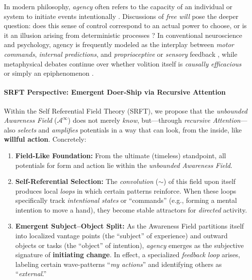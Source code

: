 \documentclass[12pt,a4paper]{article}
\begin{document}
In modern philosophy, \emph{agency} often refers to the capacity of an individual
or system to initiate events intentionally \cite{shoemaker2003agency,metzinger2003subject}. Discussions of \emph{free will} pose the
deeper question: does this sense of control correspond to an actual power to choose,
or is it an illusion arising from deterministic processes \cite{wegner2002}?
In conventional neuroscience and psychology, agency is frequently modeled as the interplay
between \emph{motor commands}, \emph{internal predictions}, and \emph{proprioceptive} or
\emph{sensory} feedback \cite{frith2012action}, while metaphysical debates continue over
whether volition itself is \emph{causally efficacious} or simply an epiphenomenon
\cite{whitehead1929process}.

\paragraph{SRFT Perspective: Emergent Doer-Ship via Recursive Attention}
\label{subsec:SRFT-agency-perspective}

Within the Self Referential Field Theory (SRFT), we propose that the \emph{unbounded
Awareness Field} (\(\mathscr{A}^\infty\)) does not merely \emph{know}, but---through
\emph{recursive Attention}---also \emph{selects} and \emph{amplifies} potentials in a way
that can look, from the inside, like \textbf{willful action}. Concretely:
\begin{enumerate}
    \item \textbf{Field-Like Foundation:} From the ultimate (timeless) standpoint,
    all potentials for form and action lie within the \emph{unbounded Awareness Field}.

    \item \textbf{Self-Referential Selection:} The \emph{convolution} (\(\sim\)) of
    this field upon itself produces local \emph{loops} in which certain patterns
    reinforce. When these loops specifically track \emph{intentional states} or
    “commands” (e.g., forming a mental intention to move a hand), they become stable
    attractors for \emph{directed} activity.

    \item \textbf{Emergent Subject--Object Split:} As the Awareness Field partitions
    itself into localized vantage points (the “subject” of experience) and outward
    objects or tasks (the “object” of intention), \emph{agency} emerges as the subjective
    signature of \textbf{initiating change}. In effect, a specialized \emph{feedback loop}
    arises, labeling certain wave-patterns “\emph{my actions}” and identifying others as
    “\emph{external}.”
\end{enumerate}
\end{document}

